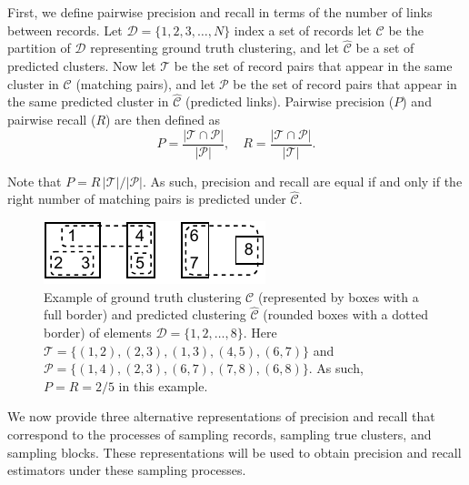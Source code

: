\documentclass[fontsize=11pt]{article}
\newcommand{\ob}[1]{{#1}}
\theoremstyle{definition}
\begin{document}
First, we define pairwise precision and recall in terms of the number of links between records. Let $\mathcal{D} = \{1, 2, 3, \dots, N\}$ index a set of records let $\mathcal{C}$ be the partition of $\mathcal{D}$ representing ground truth clustering, and let $\widehat{\mathcal{C}}$ be a set of predicted clusters. Now let $\mathcal{T}$ be the set of record pairs that appear in the same cluster in $\mathcal{C}$ (matching pairs), and let $\mathcal{P}$ be the set of record pairs that appear in the same predicted cluster in $\widehat{\mathcal{C}}$ (predicted links). Pairwise precision ($P$) and pairwise recall ($R$) are then defined as
\begin{equation}\label{eq:def_P_R}
    P = \frac{\lvert \mathcal{T} \cap \mathcal{P} \rvert}{\lvert \mathcal{P} \rvert}, \quad R = \frac{\lvert \mathcal{T} \cap \mathcal{P} \rvert}{\lvert \mathcal{T} \rvert}.
\end{equation}

Note that $P = R \, \lvert \mathcal{T} \rvert / \lvert \mathcal{P} \rvert$. As such, precision and recall are equal if and only if the right number of matching pairs is predicted under $\widehat{\mathcal{C}}$.

\begin{figure}[h]
    \centering
    \includegraphics{paper/clustering-example.pdf}
    \caption{\ob{Example of ground truth clustering $\mathcal{C}$ (represented by boxes with a full border) and predicted clustering $\widehat{\mathcal{C}}$ (rounded boxes with a dotted border) of elements $\mathcal{D} = \{1,2,\dots, 8\}$. Here $\mathcal{T} = \{(1,2), (2,3), (1,3), (4,5), (6,7)\}$ and $\mathcal{P} = \{(1,4), (2,3), (6,7), (7,8), (6,8)\}$. As such, $P = R = 2/5$ in this example.}}
    \label{fig:my_label}
\end{figure}

We now provide three alternative representations of precision and recall that correspond to the processes of sampling records, sampling true clusters, and sampling blocks. These representations will be used to obtain precision and recall estimators under these sampling processes.
\end{document}
